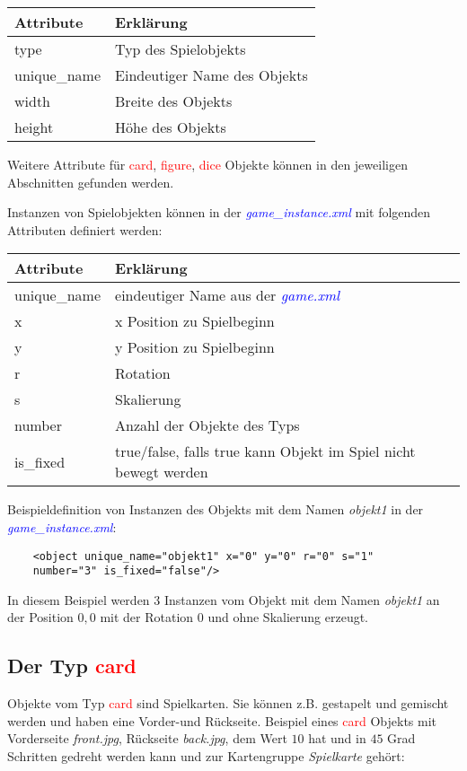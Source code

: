\documentclass{scrbook}
\newcommand{\gamefile}[1]{\textit{\textcolor{blue}{#1}}\xspace}
\newcommand{\game}{\gamefile{game.xml}}
\newcommand{\gameinstance}{\gamefile{game\_instance.xml}}
\newcommand{\card}{\textcolor{red}{card}\xspace}
\newcommand{\gamefigure}{\textcolor{red}{figure}\xspace}
\newcommand{\dice}{\textcolor{red}{dice}\xspace}
\begin{document}
	\begin{table}[!h]
		\renewcommand{\arraystretch}{1.5}
		\begin{tabularx}{\textwidth}{XX}
			Attribute & Erklärung\\\hline
			type & Typ des Spielobjekts\\
			unique\_name & Eindeutiger Name des Objekts\\
			width & Breite des Objekts\\
			height & Höhe des Objekts\\
		\end{tabularx}
	\end{table}

	Weitere Attribute für \card, \gamefigure, \dice Objekte können in den jeweiligen Abschnitten gefunden werden.

	Instanzen von Spielobjekten können in der \gameinstance mit folgenden Attributen definiert werden:
	
	\begin{table}[!h]
		\renewcommand{\arraystretch}{1.5}		\begin{tabularx}{\textwidth}{XXX}
			Attribute & Erklärung\\\hline
			unique\_name & eindeutiger Name aus der \game\\
			x & x Position zu Spielbeginn\\
			y & y Position zu Spielbeginn\\
			r & Rotation\\
			s & Skalierung\\
			number & Anzahl der Objekte des Typs\\
			is\_fixed & true/false, falls true kann Objekt im Spiel nicht bewegt werden\\
		\end{tabularx}
	\end{table}

	Beispieldefinition von Instanzen des Objekts mit dem Namen \textit{objekt1} in der \gameinstance:
	
	\lstset{language=XML}
	\begin{lstlisting}
	<object unique_name="objekt1" x="0" y="0" r="0" s="1" 
	number="3" is_fixed="false"/>
	\end{lstlisting}
	
	In diesem Beispiel werden $3$ Instanzen vom Objekt mit dem Namen \textit{objekt1} an der Position $0,0$ mit der Rotation $0$ und ohne Skalierung erzeugt.

	
	\subsection{Der Typ \card}
	Objekte vom Typ \card sind Spielkarten. Sie können z.B. gestapelt und gemischt werden und haben eine Vorder-und Rückseite.
	Beispiel eines \card Objekts mit Vorderseite \textit{front.jpg}, Rückseite \textit{back.jpg}, dem Wert $10$ hat und in $45$ Grad Schritten gedreht werden kann und zur Kartengruppe \textit{Spielkarte} gehört:
	
\end{document}
